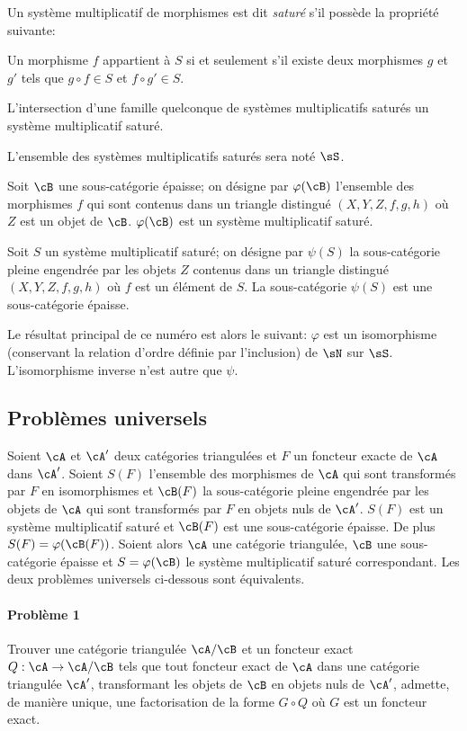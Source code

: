 Un système multiplicatif de morphismes est dit \emph{saturé} s'il possède 
la propriété suivante: 

Un morphisme $f$ appartient à $S$ si et seulement s'il existe deux 
morphismes $g$ et $g'$ tels que $g\circ f\in S$ et $f\circ g'\in S$. 

L'intersection d'une famille quelconque de systèmes multiplicatifs saturés 
un système multiplicatif saturé. 

L'ensemble des systèmes multiplicatifs saturés sera noté $\sS$. 

Soit $\cB$ une sous-catégorie épaisse; on désigne par $\varphi(\cB)$ 
l'ensemble des morphismes $f$ qui sont contenus dans un triangle distingué 
$(X,Y,Z,f,g,h)$ où $Z$ est un objet de $\cB$. $\varphi(\cB)$ est un 
système multiplicatif saturé. 

Soit $S$ un système multiplicatif saturé; on désigne par $\psi(S)$ la 
sous-catégorie pleine engendrée par les objets $Z$ contenus dans un 
triangle distingué $(X,Y,Z,f,g,h)$ où $f$ est un élément de $S$. La 
sous-catégorie $\psi(S)$ est une sous-catégorie épaisse. 

Le résultat principal de ce numéro est alors le suivant: $\varphi$ est un 
isomorphisme (conservant la relation d'ordre définie par l'inclusion) de 
$\sN$ sur $\sS$. L'isomorphisme inverse n'est autre que $\psi$. 










\subsection{Problèmes universels}\label{VIII:2-2}

Soient $\cA$ et $\cA'$ deux catégories triangulées et $F$ un foncteur 
exacte de $\cA$ dans $\cA'$. Soient $S(F)$ l'ensemble des morphismes de $\cA$ 
qui sont transformés par $F$ en isomorphismes et $\cB(F)$ la sous-catégorie 
pleine engendrée par les objets de $\cA$ qui sont transformés par $F$ en 
objets nuls de $\cA'$. $S(F)$ est un système multiplicatif saturé et 
$\cB(F)$ est une sous-catégorie épaisse. De plus $S(F) = \varphi(\cB(F))$. 
Soient alors $\cA$ une catégorie triangulée, $\cB$ une sous-catégorie 
épaisse et $S=\varphi(\cB)$ le système multiplicatif saturé 
correspondant. Les deux problèmes universels ci-dessous sont équivalents. 


\paragraph{Problème 1}
\hypertarget{VIII:prob1}{}
Trouver une catégorie triangulée $\cA/\cB$ et un foncteur exact 
$Q:\cA\to \cA/\cB$ tels que tout foncteur exact de $\cA$ dans une catégorie 
triangulée $\cA'$, transformant les objets de $\cB$ en objets nuls de 
$\cA'$, admette, de manière unique, une factorisation de la forme $G\circ Q$ 
où $G$ est un foncteur exact. 


